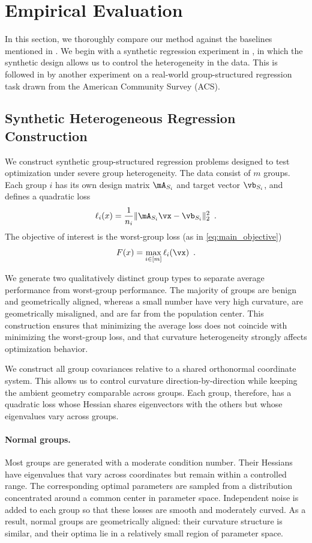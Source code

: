 \section{Empirical Evaluation}\label{app:exps}
In this section, we thoroughly compare our method against the baselines mentioned in . We begin with a synthetic regression experiment in , in which the synthetic design allows us to control the heterogeneity in the data. This is followed in  by another experiment on a real-world group-structured regression task drawn from the American Community Survey (ACS). 

\subsection{Synthetic Heterogeneous Regression Construction}
\label{app:data_generation}

We construct synthetic group-structured regression problems designed to test optimization under severe group heterogeneity. The data consist of $m$ groups. Each group $i$ has its own design matrix $\mA_{S_i}$ and target vector $\vb_{S_i}$, and defines a quadratic loss
\[
\ell_i(x) = \frac{1}{n_i} \|\mA_{S_i} \vx - \vb_{S_i}\|_2^2 \enspace.
\]
The objective of interest is the worst-group loss (as in \eqref{eq:main_objective})
\[
F(x) = \max_{i \in [m]} \ell_i(\vx) \enspace.
\]

We generate two qualitatively distinct group types to separate average performance from worst-group performance. The majority of groups are benign and geometrically aligned, whereas a small number have very high curvature, are geometrically misaligned, and are far from the population center. This construction ensures that minimizing the average loss does not coincide with minimizing the worst-group loss, and that curvature heterogeneity strongly affects optimization behavior.


We construct all group covariances relative to a shared orthonormal coordinate system. This allows us to control curvature direction-by-direction while keeping the ambient geometry comparable across groups. Each group, therefore, has a quadratic loss whose Hessian shares eigenvectors with the others but whose eigenvalues vary across groups.

\paragraph{Normal groups.}
Most groups are generated with a moderate condition number. Their Hessians have eigenvalues that vary across coordinates but remain within a controlled range. The corresponding optimal parameters are sampled from a distribution concentrated around a common center in parameter space. Independent noise is added to each group so that these losses are smooth and moderately curved. As a result, normal groups are geometrically aligned: their curvature structure is similar, and their optima lie in a relatively small region of parameter space.

